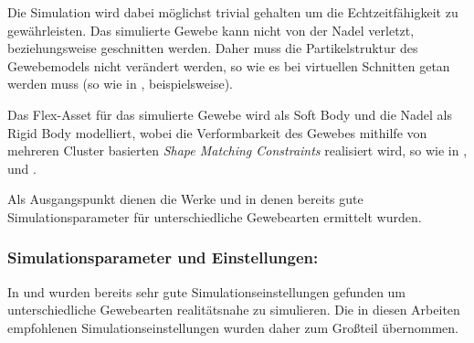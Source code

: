 Die Simulation wird dabei möglichst trivial gehalten um die Echtzeitfähigkeit zu gewährleisten. Das simulierte Gewebe kann nicht von der Nadel verletzt, beziehungsweise geschnitten werden. Daher muss die Partikelstruktur des Gewebemodels nicht verändert werden, so wie es bei virtuellen Schnitten getan werden muss (so wie in \cite{PBDCutting}, beispielsweise).

Das Flex-Asset für das simulierte Gewebe wird als Soft Body und die Nadel als Rigid Body modelliert, wobei die Verformbarkeit des Gewebes mithilfe von mehreren Cluster basierten \textit{Shape Matching Constraints} realisiert wird, so wie in \cite{UPP}, \cite{BreastBiopsy} und \cite{PBDKidney}. 

Als Ausgangspunkt dienen die Werke \cite{PBDKidney} und \cite{BreastBiopsy} in denen bereits gute Simulationsparameter für unterschiedliche Gewebearten ermittelt wurden.

\subsubsection{Simulationsparameter und Einstellungen: }    

In \cite{PBDKidney} und \cite{BreastBiopsy} wurden bereits sehr gute Simulationseinstellungen gefunden um unterschiedliche Gewebearten realitätsnahe zu simulieren. Die in diesen Arbeiten empfohlenen Simulationseinstellungen wurden daher zum Großteil übernommen.

